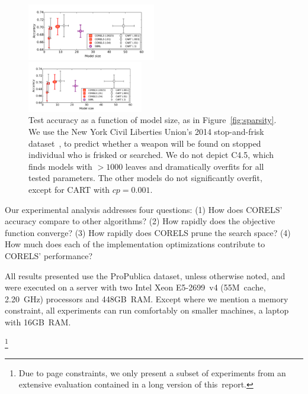 \begin{figure}[b!]
\begin{center}
\begin{arxiv}
\includegraphics[width=0.5\textwidth]{figs/frisk-sparsity.pdf}
\end{arxiv}
\begin{kdd}
\includegraphics[trim={20mm, 10mm, 20mm, 20mm}, width=0.45\textwidth]{figs/frisk-sparsity.pdf}
\end{kdd}
\end{center}
\caption{Test accuracy as a function of model size,
as in Figure~\ref{fig:sparsity}.
%
We use the New York Civil Liberties Union's 2014 stop-and-frisk dataset~\cite{nyclu:2014},
to predict whether a weapon will be found on stopped individual
who is frisked or searched.
%
We do not depict C4.5, which finds models with $>1000$ leaves
and dramatically overfits for all tested parameters.
%
The other models do not significantly overfit, except for CART with ${cp = 0.001}$.
}
\label{fig:frisk-sparsity}
\end{figure}


Our experimental analysis addresses four questions:
(1) How does CORELS' accuracy compare to other algorithms?
(2) How rapidly does the objective function converge?
(3) How rapidly does CORELS prune the search space?
(4) How much does each of the implementation optimizations contribute to CORELS' performance?

All results presented use the ProPublica dataset, unless otherwise noted,
and were executed on a server with two Intel Xeon E5-2699~v4
(55M~cache, 2.20~GHz) processors and 448GB~RAM.
%
Except where we mention a memory constraint, all experiments
can run comfortably on smaller machines, \eg a laptop with 16GB~RAM.
%
\begin{kdd}
\footnote{Due to page constraints, we only present a subset of experiments
from an extensive evaluation contained in a long version of this~report.}
\end{kdd}

